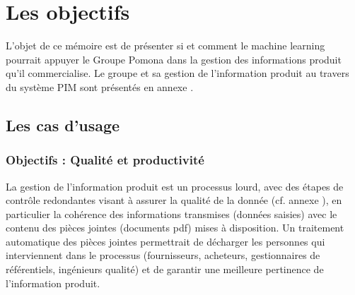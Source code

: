 \part{Les objectifs}
    
    {\large
    L'objet de ce mémoire est de présenter si et comment le machine learning pourrait appuyer le Groupe Pomona dans la gestion des informations produit qu'il commercialise.
    Le groupe et sa gestion de l'information produit au travers du système PIM sont présentés en annexe .
    }

    \chapter{Les cas d'usage}
    \label{use_cases}

        \section{Objectifs : Qualité et productivité}

        La gestion de l'information produit est un processus lourd, avec des étapes de contrôle redondantes visant à assurer la qualité de la donnée (cf. annexe ), en particulier la cohérence des informations transmises (données saisies) avec le contenu des pièces jointes (documents pdf) mises à disposition.
        Un traitement automatique des pièces jointes permettrait de décharger les personnes qui interviennent dans le processus (fournisseurs, acheteurs, gestionnaires de référentiels, ingénieurs qualité) et de garantir une meilleure pertinence de l'information produit.

